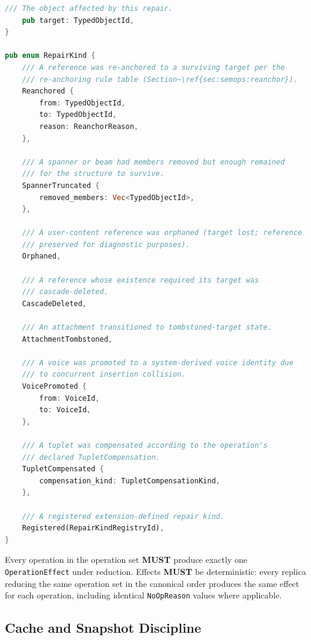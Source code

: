 \documentclass[11pt,letterpaper]{report}
\newcounter{requirement}[chapter]
\newcommand{\MUST}{\textbf{MUST}}
\begin{document}
\begin{lstlisting}[language=Rust]
    /// The object affected by this repair.
    pub target: TypedObjectId,
}

pub enum RepairKind {
    /// A reference was re-anchored to a surviving target per the
    /// re-anchoring rule table (Section~\ref{sec:semops:reanchor}).
    Reanchored {
        from: TypedObjectId,
        to: TypedObjectId,
        reason: ReanchorReason,
    },

    /// A spanner or beam had members removed but enough remained
    /// for the structure to survive.
    SpannerTruncated {
        removed_members: Vec<TypedObjectId>,
    },

    /// A user-content reference was orphaned (target lost; reference
    /// preserved for diagnostic purposes).
    Orphaned,

    /// A reference whose existence required its target was
    /// cascade-deleted.
    CascadeDeleted,

    /// An attachment transitioned to tombstoned-target state.
    AttachmentTombstoned,

    /// A voice was promoted to a system-derived voice identity due
    /// to concurrent insertion collision.
    VoicePromoted {
        from: VoiceId,
        to: VoiceId,
    },

    /// A tuplet was compensated according to the operation's
    /// declared TupletCompensation.
    TupletCompensated {
        compensation_kind: TupletCompensationKind,
    },

    /// A registered extension-defined repair kind.
    Registered(RepairKindRegistryId),
}
\end{lstlisting}

\begin{requirement}
  \label{req:semops:total-operation-effects}
  Every operation in the operation set \MUST{} produce exactly one
  \texttt{OperationEffect} under reduction. Effects \MUST{} be
  deterministic: every replica reducing the same operation set in
  the canonical order produces the same effect for each operation,
  including identical \texttt{NoOpReason} values where applicable.
\end{requirement}

\subsection{Cache and Snapshot Discipline}
\label{sec:semops:caches}
\end{document}
